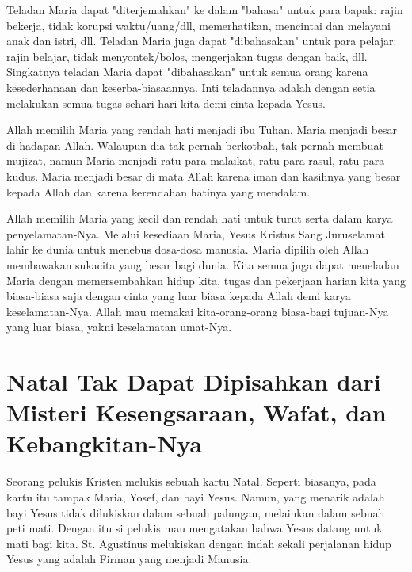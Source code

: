 Teladan Maria dapat "diterjemahkan" ke dalam "bahasa" untuk para bapak: rajin bekerja, tidak korupsi waktu/uang/dll, memerhatikan, mencintai dan melayani anak dan istri, dll. Teladan Maria juga dapat "dibahasakan" untuk para pelajar: rajin belajar, tidak menyontek/bolos, mengerjakan tugas dengan baik, dll. Singkatnya teladan Maria dapat "dibahasakan" untuk semua orang karena kesederhanaan dan keserba-biasaannya. Inti teladannya adalah dengan setia melakukan semua tugas sehari-hari kita demi cinta kepada Yesus.

Allah memilih Maria yang rendah hati menjadi ibu Tuhan. Maria menjadi besar di hadapan Allah. Walaupun dia tak pernah berkotbah, tak pernah membuat mujizat, namun Maria menjadi ratu para malaikat, ratu para rasul, ratu para kudus. Maria menjadi besar di mata Allah karena iman dan kasihnya yang besar kepada Allah dan karena kerendahan hatinya yang mendalam. 

Allah memilih Maria yang kecil dan rendah hati untuk turut serta dalam karya penyelamatan-Nya. Melalui kesediaan Maria, Yesus Kristus Sang Juruselamat lahir ke dunia untuk menebus dosa-dosa manusia. Maria dipilih oleh Allah membawakan sukacita yang besar bagi dunia. Kita semua juga dapat meneladan Maria dengan memersembahkan hidup kita, tugas dan pekerjaan harian kita yang biasa-biasa saja dengan cinta yang luar biasa kepada Allah demi karya keselamatan-Nya. Allah mau memakai kita-orang-orang biasa-bagi tujuan-Nya yang luar biasa, yakni keselamatan umat-Nya.

\section*{Natal Tak Dapat Dipisahkan dari Misteri Kesengsaraan, Wafat, dan Kebangkitan-Nya}


Seorang pelukis Kristen melukis sebuah kartu Natal. Seperti biasanya, pada kartu itu tampak Maria, Yosef, dan bayi Yesus. Namun, yang menarik adalah bayi Yesus tidak dilukiskan dalam sebuah palungan, melainkan dalam sebuah peti mati. Dengan itu si pelukis mau mengatakan bahwa Yesus datang untuk mati bagi kita. St. Agustinus melukiskan dengan indah sekali perjalanan hidup Yesus yang adalah Firman yang menjadi Manusia:

